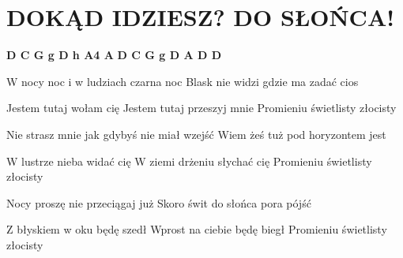 \documentclass[../../../songbook.tex]{subfiles}
\begin{document}
\TabPositions{8cm} %
\section*{DOKĄD IDZIESZ? DO SŁOŃCA!}
{}
\vspace{0.5cm}
{\color{red}\textbf{D C G g D h A4 A} } \newline
{\color{red}\textbf{D C G g D A D D} } \newline

W nocy noc i w ludziach czarna noc	 \newline
Blask nie widzi gdzie ma zadać cios \newline

\-\hspace{1cm} Jestem tutaj wołam cię		 \newline
\-\hspace{1cm} Jestem tutaj przeszyj mnie	 \newline
\-\hspace{1cm} Promieniu świetlisty złocisty \newline

Nie strasz mnie jak gdybyś nie miał wzejść \newline
Wiem żeś tuż pod horyzontem jest \newline

\-\hspace{1cm} W lustrze nieba widać cię \newline
\-\hspace{1cm} W ziemi drżeniu słychać cię \newline
\-\hspace{1cm} Promieniu świetlisty złocisty \newline

Nocy proszę nie przeciągaj już	 \newline
Skoro świt do słońca pora pójść	 \newline

\-\hspace{1cm} Z błyskiem w oku będę szedł \newline
\-\hspace{1cm} Wprost na ciebie będę biegł \newline
\-\hspace{1cm} Promieniu świetlisty złocisty \newline
\end{document}
